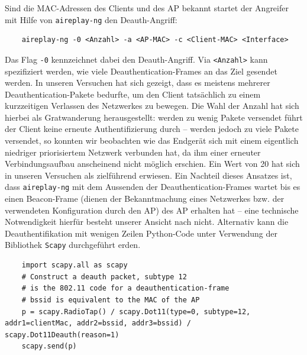 Sind die MAC-Adressen des Clients und des AP bekannt startet der Angreifer mit Hilfe von \texttt{aireplay-ng} den Deauth-Angriff: 
\begin{Verbatim}
	aireplay-ng -0 <Anzahl> -a <AP-MAC> -c <Client-MAC> <Interface>
\end{Verbatim}
Das Flag \texttt{-0} kennzeichnet dabei den Deauth-Angriff.
Via \texttt{<Anzahl>} kann spezifiziert werden, wie viele Deauthentication-Frames an das Ziel gesendet werden.
In unseren Versuchen hat sich gezeigt, dass es meistens mehrerer Deauthentication-Pakete bedurfte, um den Client tatsächlich zu einem kurzzeitigen Verlassen des Netzwerkes zu bewegen. Die Wahl der Anzahl hat sich hierbei als Gratwanderung herausgestellt: werden zu wenig Pakete versendet führt der Client keine erneute Authentifizierung durch -- werden jedoch zu viele Pakete versendet, so konnten wir beobachten wie das Endgerät sich mit einem eigentlich niedriger priorisiertem Netzwerk verbunden hat, da ihm einer erneuter Verbindungsaufbau anscheinend nicht möglich erschien. Ein Wert von 20 hat sich in unseren Versuchen als zielführend erwiesen.
Ein Nachteil dieses Ansatzes ist, dass \texttt{aireplay-ng} mit dem Aussenden der Deauthentication-Frames wartet bis es einen Beacon-Frame (dienen der Bekanntmachung eines Netzwerkes bzw. der verwendeten Konfiguration durch den AP) des AP erhalten hat -- eine technische Notwendigkeit hierfür besteht unserer Ansicht nach nicht.
Alternativ kann die Deauthentifikation mit wenigen Zeilen Python-Code unter Verwendung der Bibliothek \texttt{Scapy} durchgeführt erden.

\begin{verbatim}
	import scapy.all as scapy
	# Construct a deauth packet, subtype 12 
	# is the 802.11 code for a deauthentication-frame
	# bssid is equivalent to the MAC of the AP
	p = scapy.RadioTap() / scapy.Dot11(type=0, subtype=12, addr1=clientMac, addr2=bssid, addr3=bssid) / scapy.Dot11Deauth(reason=1)
	scapy.send(p)
\end{verbatim}

